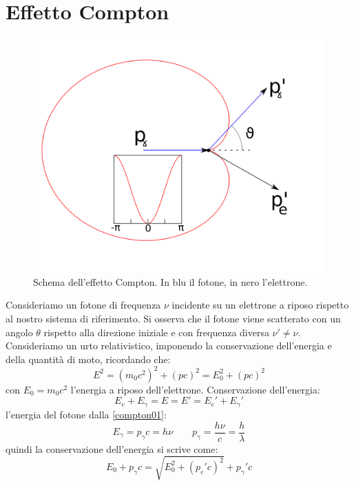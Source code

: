 \section{Effetto Compton}
\begin{figure}[htbp]
	\centering
	\includegraphics[scale=0.5]{immagini/fisica3/compton}
	\caption{Schema dell'effetto Compton. In blu il fotone, in nero l'elettrone.}
	\label{fig:compton}
\end{figure}
Consideriamo un fotone di frequenza $\nu$ incidente su un elettrone a riposo rispetto al nostro sistema di riferimento. Si osserva che il fotone viene scatterato con un angolo $\theta$ rispetto alla direzione iniziale e con frequenza diversa $\nu'\neq\nu$. Consideriamo un urto relativistico, imponendo la conservazione dell'energia e della quantità di moto, ricordando che:
\begin{equation}
	E^2=(m_0c^2)^2+(pc)^2=E_0^2+(pc)^2
	\label{compton01}
\end{equation}
con $E_0=m_0c^2$ l'energia a riposo dell'elettrone. Conservazione dell'energia:
\begin{equation}
	E_{e}+E_{\gamma}=E=E'=E_e'+E_{\gamma}'
\end{equation}
l'energia del fotone dalla \eqref{compton01}:
\begin{equation}
	E_{\gamma}=p_\gamma c=h\nu\qquad p_\gamma=\frac{h\nu}{c}=\frac{h}{\lambda}
\end{equation}
quindi la conservazione dell'energia si scrive come:
\begin{equation}
	E_{0}+p_\gamma c=\sqrt{E_0^2+(p_e' c)^2}+p_\gamma'c
\end{equation}
